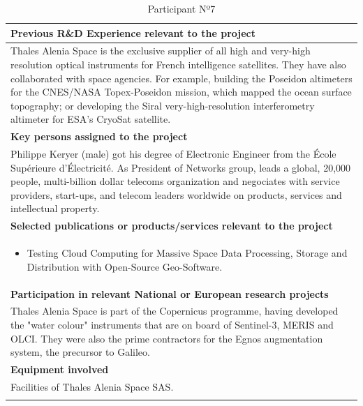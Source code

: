 \begin{longtable}[H]{|p{0.7cm}|p{4cm}|p{7cm}|p{1.3cm}|}
	\multicolumn{4}{|p{13cm}|}{\textbf{Previous R\&D Experience relevant to the project}}  \\ \hline
	
	\multicolumn{4}{|p{14.5cm}|}{Thales Alenia Space is the exclusive supplier of all high and very-high resolution optical instruments for French intelligence satellites. They have also collaborated with space agencies. For example, building the Poseidon altimeters for the CNES/NASA Topex-Poseidon mission, which mapped the ocean surface topography; or developing the Siral very-high-resolution interferometry altimeter for ESA's CryoSat satellite.}  \\ \hline
	
	\multicolumn{4}{|p{13cm}|}{\textbf{Key persons assigned to the project}}   \\ \hline
	
	\multicolumn{4}{|p{14.5cm}|}{Philippe Keryer (male) got his degree of Electronic Engineer from the École Supérieure d'Électricité. As President of Networks group, leads a global, 20,000 people, multi-billion dollar telecoms organization and negociates with service providers, start-ups, and telecom leaders worldwide on products, services and intellectual property.}  \\ \hline
	
	\multicolumn{4}{|p{13cm}|}{\textbf{Selected publications or products/services relevant to the project}}  \\ \hline
	
	\multicolumn{4}{|p{14.5cm}|}{
	\begin{itemize}
		\item \vspace{-0.5cm}Testing Cloud Computing for Massive Space Data Processing, Storage and Distribution with Open-Source Geo-Software.\vspace{-0.3cm}
	\end{itemize}}  \\ \hline
	
	\multicolumn{4}{|p{13cm}|}{\textbf{Participation in relevant National or European research projects}}  \\ \hline
	
	\multicolumn{4}{|p{14.5cm}|}{Thales Alenia Space is part of the Copernicus programme, having developed the "water colour" instruments that are on board of Sentinel-3, MERIS and OLCI. They were also the prime contractors for the Egnos augmentation system, the precursor to Galileo.}  \\ \hline
	
	\multicolumn{4}{|p{13cm}|}{\textbf{Equipment involved}}  \\ \hline
	
	\multicolumn{4}{|p{14.5cm}|}{Facilities of Thales Alenia Space SAS.}  \\ \hline
	\caption{Participant Nº7}
\end{longtable}



